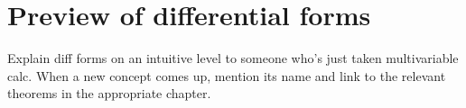 \chapter*{Preview of differential forms}

Explain diff forms on an intuitive level to someone who's just taken multivariable calc. When a new concept comes up, mention its name and link to the relevant theorems in the appropriate chapter.